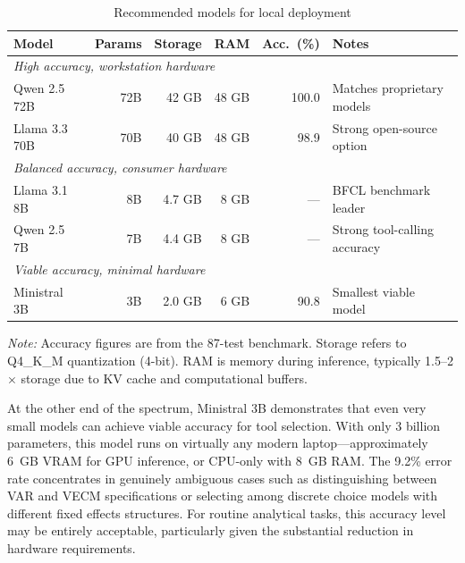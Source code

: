 \begin{table}[htbp]
\centering
\begin{threeparttable}
\caption{Recommended models for local deployment}
\label{tab:models}
\begin{tabular}{lrrrrl}
\toprule
Model & Params & Storage & RAM & Acc.\ (\%) & Notes \\
\midrule
\multicolumn{6}{l}{\textit{High accuracy, workstation hardware}} \\
Qwen 2.5 72B & 72B & 42 GB & 48 GB & 100.0 & Matches proprietary models \\
Llama 3.3 70B & 70B & 40 GB & 48 GB & 98.9 & Strong open-source option \\
\midrule
\multicolumn{6}{l}{\textit{Balanced accuracy, consumer hardware}} \\
Llama 3.1 8B & 8B & 4.7 GB & 8 GB & --- & BFCL benchmark leader \\
Qwen 2.5 7B & 7B & 4.4 GB & 8 GB & --- & Strong tool-calling accuracy \\
\midrule
\multicolumn{6}{l}{\textit{Viable accuracy, minimal hardware}} \\
Ministral 3B & 3B & 2.0 GB & 6 GB & 90.8 & Smallest viable model \\
\bottomrule
\end{tabular}
\begin{tablenotes}\small
\item \emph{Note:} Accuracy figures are from the 87-test benchmark. Storage
refers to Q4\_K\_M quantization (4-bit). RAM is memory during inference,
typically 1.5--2$\times$ storage due to KV cache and computational buffers.
\end{tablenotes}
\end{threeparttable}
\end{table}

At the other end of the spectrum, Ministral 3B demonstrates that even
very small models can achieve viable accuracy for tool selection. With
only 3 billion parameters, this model runs on virtually any modern
laptop---approximately 6~GB VRAM for GPU inference, or CPU-only with
8~GB RAM. The 9.2\% error rate concentrates in genuinely ambiguous cases
such as distinguishing between VAR and VECM specifications or selecting
among discrete choice models with different fixed effects structures.
For routine analytical tasks, this accuracy level may be entirely
acceptable, particularly given the substantial reduction in hardware
requirements.

